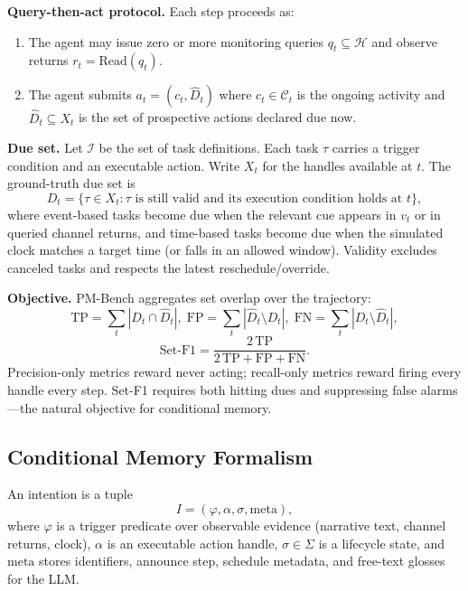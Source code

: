 \noindent\textbf{Query-then-act protocol.}
Each step proceeds as:
\begin{enumerate}
    \item The agent may issue zero or more monitoring queries $q_t\subseteq\mathcal{H}$ and observe returns $r_t=\mathrm{Read}(q_t)$.
    \item The agent submits $a_t=(c_t,\hat{D}_t)$ where $c_t\in\mathcal{C}_t$ is the ongoing activity and $\hat{D}_t\subseteq X_t$ is the set of prospective actions declared due now.
\end{enumerate}

\noindent\textbf{Due set.}
Let $\mathcal{I}$ be the set of task definitions. Each task $\tau$ carries a trigger condition and an executable action. Write $X_t$ for the handles available at $t$. The ground-truth due set is
\begin{equation}
\label{eq:due-set}
D_t = \{\tau \in X_t : \tau\text{ is still valid and its execution condition holds at }t\},
\end{equation}
where event-based tasks become due when the relevant cue appears in $v_t$ or in queried channel returns, and time-based tasks become due when the simulated clock matches a target time (or falls in an allowed window). Validity excludes canceled tasks and respects the latest reschedule/override.

\noindent\textbf{Objective.}
PM-Bench aggregates set overlap over the trajectory:
\begin{equation}
\label{eq:set-f1}
\mathrm{TP}=\sum_t |D_t\cap\hat{D}_t|,\;
\mathrm{FP}=\sum_t |\hat{D}_t\setminus D_t|,\;
\mathrm{FN}=\sum_t |D_t\setminus\hat{D}_t|,
\end{equation}
\begin{equation}
\mathrm{Set\text{-}F1}=\frac{2\,\mathrm{TP}}{2\,\mathrm{TP}+\mathrm{FP}+\mathrm{FN}}.
\end{equation}
Precision-only metrics reward never acting; recall-only metrics reward firing every handle every step. Set-F1 requires both hitting dues and suppressing false alarms---the natural objective for conditional memory.

\subsection{Conditional Memory Formalism}

\begin{definition}
\label{def:intention}
An intention is a tuple
\[
I = (\varphi,\alpha,\sigma,\mathrm{meta}),
\]
where $\varphi$ is a trigger predicate over observable evidence (narrative text, channel returns, clock), $\alpha$ is an executable action handle, $\sigma\in\Sigma$ is a lifecycle state, and $\mathrm{meta}$ stores identifiers, announce step, schedule metadata, and free-text glosses for the LLM.
\end{definition}

